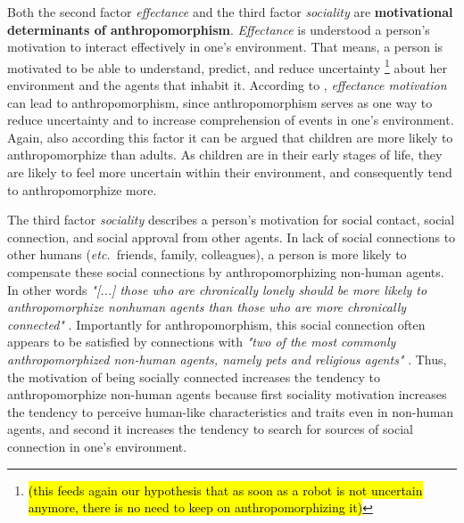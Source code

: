 \documentclass{frontiersSCNS} %
\newcommand{\etc}{{\textit{etc.~}}}
\begin{document}
Both the second factor \textit{effectance} and the third factor \textit{sociality} are \textbf{motivational determinants of anthropomorphism}. \textit{Effectance} is understood a person's motivation to interact effectively in one's environment. That means, a person is motivated to be able to understand, predict, and reduce uncertainty \footnote{\hl{(this feeds again our hypothesis that as soon as a robot is not uncertain anymore, there is no need to keep on anthropomorphizing it)}} about her environment and the agents that inhabit it. According to \cite{epley_seeing_2007}, \textit{effectance motivation} can lead to anthropomorphism, since anthropomorphism serves as one way to reduce uncertainty and to increase comprehension of events in one's environment. Again, also according this factor it can be argued that children are more likely to anthropomorphize than adults. As children are in their early stages of life, they are likely to feel more uncertain within their environment, and consequently tend to anthropomorphize more.

The third factor \textit{sociality} describes a person's motivation for social contact, social connection, and social approval from other agents. In lack of social connections to other humans (\etc friends, family, colleagues), a person is more likely to compensate these social connections by anthropomorphizing non-human agents. In other words \textit{"[...] those who are chronically lonely should be more likely to anthropomorphize nonhuman agents than those who are more chronically connected"} \citep{epley_seeing_2007}. Importantly for anthropomorphism, this social connection often appears to be satisfied by connections with \textit{"two of the most commonly anthropomorphized non-human agents, namely pets and religious agents"} \citep{epley_seeing_2007}. Thus, the motivation of being socially connected increases the tendency to anthropomorphize non-human agents because first sociality motivation increases the tendency to perceive human-like characteristics and traits even in non-human agents, and second it increases the tendency to search for sources of social connection in one's environment.

  

%
%
%
%
%
%
\end{document}

